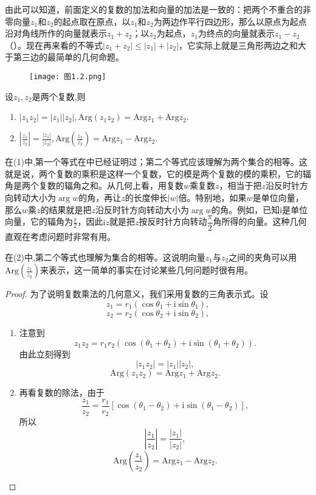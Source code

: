 \documentclass[../../main.tex]{subfiles}
\begin{document}
由此可以知道，前面定义的复数的加法和向量的加法是一致的：把两个不重合的非零向量\(z_1\)和\(z_2\)的起点取在原点，以\(z_1\)和\(z_2\)为两边作平行四边形，那么以原点为起点沿对角线所作的向量就表示\(z_1 + z_2\)；以\(z_2\)为起点，\(z_1\)为终点的向量就表示\(z_1 - z_2\)（）。现在再来看的不等式\(|z_1 + z_2| \leqslant |z_1| + |z_2|\)，它实际上就是三角形两边之和大于第三边的最简单的几何命题。
\begin{figure}[H]
\centering
\texttt{[image: 图1.2.png]}
\caption{}
\label{figure:图1.2}
\end{figure}
\begin{theorem}
设$z_1,z_2$是两个复数,则
\begin{enumerate}[(1)]
\item $|z_1z_2| = |z_1||z_2|,\mathrm{Arg}(z_1z_2) = \mathrm{Arg}z_1 + \mathrm{Arg}z_2.$

\item $\left| \frac{z_1}{z_2} \right| = \frac{|z_1|}{|z_2|},
\mathrm{Arg}\left( \frac{z_1}{z_2} \right) = \mathrm{Arg}z_1 - \mathrm{Arg}z_2.$
\end{enumerate}
\end{theorem}
\begin{note}
在(1)中,第一个等式在中已经证明过；第二个等式应该理解为两个集合的相等。这就是说，两个复数的乘积是这样一个复数，它的模是两个复数的模的乘积，它的辐角是两个复数的辐角之和。从几何上看，用复数\(w\)乘复数\(z\)，相当于把\(z\)沿反时针方向转动大小为\(\arg w\)的角，再让\(z\)的长度伸长\(|w|\)倍。特别地，如果\(w\)是单位向量，那么\(w\)乘\(z\)的结果就是把\(z\)沿反时针方向转动大小为\(\arg w\)的角。例如，已知\(\mathrm{i}\)是单位向量，它的辐角为\(\frac{\pi}{2}\)，因此\(\mathrm{i}z\)就是把\(z\)按反时针方向转动\(\dfrac{\pi}{2}\)角所得的向量。这种几何直观在考虑问题时非常有用。

在(2)中,第二个等式也理解为集合的相等。这说明向量\(z_1\)与\(z_2\)之间的夹角可以用\(\mathrm{Arg}\left( \frac{z_1}{z_2} \right)\)来表示，这一简单的事实在讨论某些几何问题时很有用。
\end{note}
\begin{proof}
为了说明复数乘法的几何意义，我们采用复数的三角表示式。设
\[
z_1 = r_1(\cos\theta_1 + \mathrm{i}\sin\theta_1),
\]
\[
z_2 = r_2(\cos\theta_2 + \mathrm{i}\sin\theta_2),
\]
\begin{enumerate}[(1)]
\item 注意到
\[
z_1z_2 = r_1r_2(\cos(\theta_1 + \theta_2) + \mathrm{i}\sin(\theta_1 + \theta_2)).
\]
由此立刻得到
\[
|z_1z_2| = |z_1||z_2|,
\]
\[
\mathrm{Arg}(z_1z_2) = \mathrm{Arg}z_1 + \mathrm{Arg}z_2.
\]

\item 再看复数的除法，由于
\[
\frac{z_1}{z_2} = \frac{r_1}{r_2}[\cos(\theta_1 - \theta_2) + \mathrm{i}\sin(\theta_1 - \theta_2)],
\]
所以
\[
\left| \frac{z_1}{z_2} \right| = \frac{|z_1|}{|z_2|},
\]
\[
\mathrm{Arg}\left( \frac{z_1}{z_2} \right) = \mathrm{Arg}z_1 - \mathrm{Arg}z_2.
\]
\end{enumerate}
\end{proof}
\end{document}
